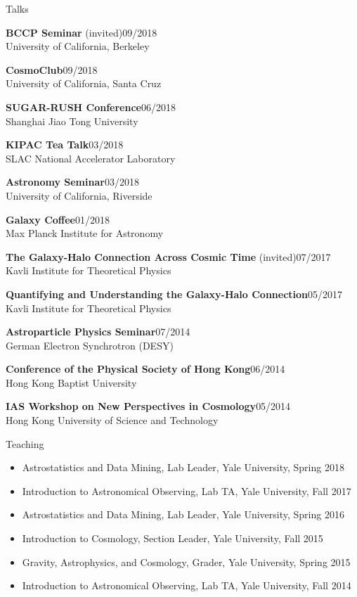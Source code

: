 \documentclass[11pt]{resume} %
\begin{document}
\begin{rSection}{Talks}
  \begin{adjustwidth}{0.5cm}{}
    \textbf{BCCP Seminar} (invited)\hfill 09/2018\\
    University of California, Berkeley

    \textbf{CosmoClub}\hfill 09/2018\\
    University of California, Santa Cruz

    \textbf{SUGAR-RUSH Conference}\hfill 06/2018\\
    Shanghai Jiao Tong University

    \textbf{KIPAC Tea Talk}\hfill 03/2018\\
    SLAC National Accelerator Laboratory

    \textbf{Astronomy Seminar}\hfill 03/2018\\
    University of California, Riverside

    \textbf{Galaxy Coffee}\hfill 01/2018\\
    Max Planck Institute for Astronomy

    \textbf{The Galaxy-Halo Connection Across Cosmic Time} (invited)\hfill 07/2017\\
    Kavli Institute for Theoretical Physics

    \textbf{Quantifying and Understanding the Galaxy-Halo Connection}\hfill 05/2017\\
    Kavli Institute for Theoretical Physics

    \textbf{Astroparticle Physics Seminar}\hfill 07/2014\\
    German Electron Synchrotron (DESY)

    \textbf{Conference of the Physical Society of Hong Kong}\hfill 06/2014\\
    Hong Kong Baptist University

    \textbf{IAS Workshop on New Perspectives in Cosmology}\hfill 05/2014\\
    Hong Kong University of Science and Technology
  \end{adjustwidth}
\end{rSection}


\begin{rSection}{Teaching}
  \begin{itemize}[leftmargin=1.0cm, topsep=0pt,itemsep=0pt,partopsep=0pt, parsep=0pt]
    \item Astrostatistics and Data Mining, Lab Leader, Yale University, Spring 2018
    \item Introduction to Astronomical Observing, Lab TA, Yale University, Fall 2017
    \item Astrostatistics and Data Mining, Lab Leader, Yale University, Spring 2016
    \item Introduction to Cosmology, Section Leader, Yale University, Fall 2015
    \item Gravity, Astrophysics, and Cosmology, Grader, Yale University, Spring 2015
    \item Introduction to Astronomical Observing, Lab TA, Yale University, Fall 2014
  \end{itemize}
\end{rSection}
\end{document}
